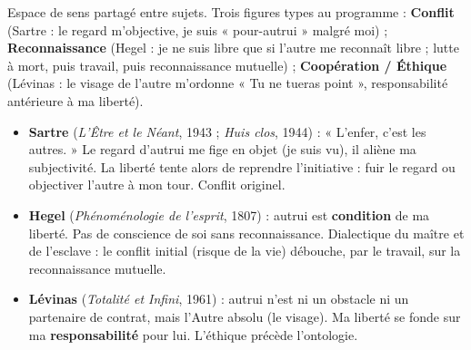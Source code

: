 \documentclass[11pt]{article}
\newcommand{\cle}[1]{{\popxbold\color{popdark}#1}}
\begin{document}
\begin{definition}[Intersubjectivité]
Espace de sens partagé entre sujets. Trois figures types au programme : \textbf{Conflit} (Sartre : le regard m'objective, je suis « pour-autrui » malgré moi) ; \textbf{Reconnaissance} (Hegel : je ne suis libre que si l'autre me reconnaît libre ; lutte à mort, puis travail, puis reconnaissance mutuelle) ; \textbf{Coopération / Éthique} (Lévinas : le visage de l'autre m'ordonne « Tu ne tueras point », responsabilité antérieure à ma liberté).
\end{definition}

\begin{aretenir}
\begin{itemize}
    \item \textbf{Sartre} (\textit{L'Être et le Néant}, 1943 ; \textit{Huis clos}, 1944) : « L'enfer, c'est les autres. » Le \cle{regard} d'autrui me fige en objet (je suis vu), il aliène ma subjectivité. La liberté tente alors de reprendre l'initiative : fuir le regard ou objectiver l'autre à mon tour. Conflit originel.
    \item \textbf{Hegel} (\textit{Phénoménologie de l'esprit}, 1807) : autrui est \textbf{condition} de ma liberté. Pas de conscience de soi sans reconnaissance. Dialectique du maître et de l'esclave : le conflit initial (risque de la vie) débouche, par le travail, sur la reconnaissance mutuelle.
    \item \textbf{Lévinas} (\textit{Totalité et Infini}, 1961) : autrui n'est ni un obstacle ni un partenaire de contrat, mais l'\cle{Autre} absolu (le visage). Ma liberté se fonde sur ma \textbf{responsabilité} pour lui. L'éthique précède l'ontologie.
\end{itemize}
\end{aretenir}
\end{document}
